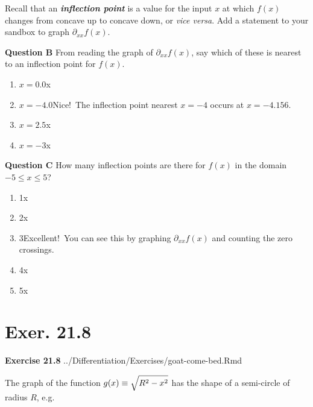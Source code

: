 \documentclass[
  letterpaper,
  DIV=11,
  numbers=noendperiod,
  oneside]{article}
\providecommand{\tightlist}{%
  \setlength{\itemsep}{0pt}\setlength{\parskip}{0pt}}\usepackage{longtable,booktabs,array}
\begin{document}
\begin{multicols}{2}
Recall that an \textbf{\emph{inflection point}} is a value for the input
\(x\) at which \(f(x)\) changes from concave up to concave down, or
\emph{vice versa}. Add a statement to your sandbox to graph
\(\partial_{xx} f(x)\).

\textbf{Question B} From reading the graph of \(\partial_{xx} f(x)\),
say which of these is nearest to an inflection point for \(f(x)\).

\begin{enumerate}
\def\labelenumi{\roman{enumi}.}
\tightlist
\item
  {\(x = 0.0\){x}}\\
\item
  {\(x = -4.0\){Nice!~The inflection point nearest \(x=-4\) occurs at
  \(x = -4.156\).}}\\
\item
  {\(x = 2.5\){x}}\\
\item
  {\(x = -3\){x}}
\end{enumerate}

\textbf{Question C} How many inflection points are there for \(f(x)\) in
the domain \(-5 \leq x \leq 5\)?

\begin{enumerate}
\def\labelenumi{\roman{enumi}.}
\tightlist
\item
  {1{x}}\\
\item
  {2{x}}\\
\item
  {3{Excellent!~You can see this by graphing \(\partial_{xx} f(x)\) and
  counting the zero crossings.}}\\
\item
  {4{x}}\\
\item
  {5{x}}
\end{enumerate}

\hypertarget{exer.-21.8}{%
\section*{Exer. 21.8}\label{exer.-21.8}}

\textbf{Exercise 21.8} ../Differentiation/Exercises/goat-come-bed.Rmd

The graph of the function \(g(x) \equiv \sqrt{\strut R^2 - x^2}\) has
the shape of a semi-circle of radius \(R\), e.g.


\end{multicols}
\end{document}
